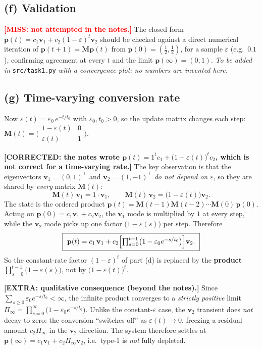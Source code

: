 \documentclass[12pt,a4paper]{article}
\newcommand{\miss}[1]{{\textbf{\textcolor{red}{[MISS: #1]}}}}
\newcommand{\fix}[1]{{\textbf{\textcolor{orange!85!black}{[CORRECTED: #1]}}}}
\newcommand{\extra}[1]{{\textbf{\textcolor{blue!80!black}{[EXTRA: #1]}}}}
\theoremstyle{definition}
\newcommand{\Mx}{\mathbf{M}}
\newcommand{\vv}{\mathbf{v}}
\newcommand{\pp}{\mathbf{p}}
\newcommand{\T}{^{\!\top}}
\begin{document}
\subsection{(f) Validation}

\miss{not attempted in the notes.} The closed form
$\pp(t)=c_1\vv_1+c_2(1-\varepsilon)^t\vv_2$ should be checked against a direct
numerical iteration of $\pp(t+1)=\Mx\pp(t)$ from $\pp(0)=(\tfrac12,\tfrac12)$,
for a sample $\varepsilon$ (e.g.\ $0.1$), confirming agreement at every $t$ and
the limit $\pp(\infty)=(0,1)$. \emph{To be added in} \texttt{src/task1.py}
\emph{with a convergence plot; no numbers are invented here.}

\subsection{(g) Time-varying conversion rate}

Now $\varepsilon(t)=\varepsilon_0\,e^{-t/t_0}$ with $\varepsilon_0,t_0>0$, so the
update matrix changes each step:
$\Mx(t)=\bigl(\begin{smallmatrix}1-\varepsilon(t) & 0\\ \varepsilon(t) & 1\end{smallmatrix}\bigr)$.

\fix{the notes wrote $\pp(t)=1^{t}c_1+\bigl(1-\varepsilon(t)\bigr)^{t}c_2$, which is
not correct for a time-varying rate.} The key observation is that the
eigenvectors $\vv_1=(0,1)\T$ and $\vv_2=(1,-1)\T$ \emph{do not depend on
$\varepsilon$}, so they are shared by \emph{every} matrix $\Mx(t)$:
\[
\Mx(t)\,\vv_1=1\cdot\vv_1,\qquad \Mx(t)\,\vv_2=\bigl(1-\varepsilon(t)\bigr)\vv_2 .
\]
The state is the ordered product $\pp(t)=\Mx(t-1)\Mx(t-2)\cdots\Mx(0)\,\pp(0)$.
Acting on $\pp(0)=c_1\vv_1+c_2\vv_2$, the $\vv_1$ mode is multiplied by $1$ at
every step, while the $\vv_2$ mode picks up one factor $\bigl(1-\varepsilon(s)\bigr)$
per step. Therefore
\[
\boxed{\ \pp(t)=c_1\,\vv_1+c_2\Bigl[\textstyle\prod_{s=0}^{t-1}\bigl(1-\varepsilon_0 e^{-s/t_0}\bigr)\Bigr]\vv_2.\ }
\]
So the constant-rate factor $(1-\varepsilon)^{t}$ of part (d) is replaced by the
\textbf{product} $\prod_{s=0}^{t-1}\bigl(1-\varepsilon(s)\bigr)$, not by
$\bigl(1-\varepsilon(t)\bigr)^{t}$.

\extra{qualitative consequence (beyond the notes).} Since
$\sum_{s\ge0}\varepsilon_0 e^{-s/t_0}<\infty$, the infinite product converges to a
\emph{strictly positive} limit $\Pi_\infty=\prod_{s=0}^{\infty}\bigl(1-\varepsilon_0 e^{-s/t_0}\bigr)$.
Unlike the constant-$\varepsilon$ case, the $\vv_2$ transient does \emph{not}
decay to zero: the conversion ``switches off'' as $\varepsilon(t)\to0$, freezing a
residual amount $c_2\Pi_\infty$ in the $\vv_2$ direction. The system therefore
settles at $\pp(\infty)=c_1\vv_1+c_2\Pi_\infty\vv_2$, i.e.\ type-1 is
\emph{not} fully depleted.
\end{document}
